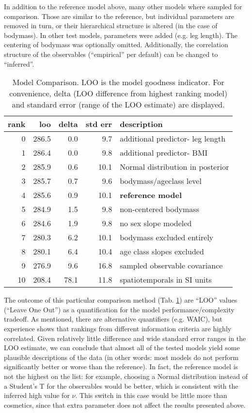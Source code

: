 In addition to the reference model above, many other models where sampled for comparison.
Those are similar to the reference, but individual parameters are removed in turn, or their hierarchical structure is altered (in the case of bodymass).
In other test models, parameters were added (e.g. leg length).
The centering of bodymass was optionally omitted.
Additionally, the correlation structure of the observables (``empirical'' per default) can be changed to ``inferred''.

\begin{table}[p]
\caption{\label{tab:stridemodelcomparison}Model Comparison. LOO is the model goodness indicator. For convenience, delta (LOO difference from highest ranking model) and standard error (range of the LOO estimate) are displayed.}
\centering
\begin{tabular}{rrrrl}
\textbf{rank} & \textbf{loo} & \textbf{delta} & \textbf{std err} & \textbf{description}\\[0pt]
\hline
0 & 286.5 & 0.0 & 9.7 & additional predictor- leg length\\[0pt]
1 & 286.4 & 0.0 & 9.8 & additional predictor- BMI\\[0pt]
2 & 285.9 & 0.6 & 10.1 & Normal distribution in posterior\\[0pt]
3 & 285.7 & 0.7 & 9.6 & bodymass/ageclass level\\[0pt]
4 & 285.6 & 0.9 & 10.1 & \textbf{reference model}\\[0pt]
5 & 284.9 & 1.5 & 9.8 & non-centered bodymass\\[0pt]
6 & 284.6 & 1.9 & 9.8 & no sex slope modeled\\[0pt]
7 & 280.3 & 6.2 & 10.1 & bodymass excluded entirely\\[0pt]
8 & 280.1 & 6.4 & 10.4 & age class slopes excluded\\[0pt]
9 & 276.9 & 9.6 & 16.8 & sampled observable covariance\\[0pt]
10 & 208.4 & 78.1 & 11.8 & spatiotemporals in SI units\\[0pt]
\end{tabular}
\end{table}


The outcome of this particular comparison method (Tab. \ref{tab:stridemodelcomparison}) are ``LOO'' values (``Leave One Out'') as a quantification for the model performance/complexity tradeoff.
As mentioned, there are alternative quantifiers (e.g. WAIC), but experience shows that rankings from different information criteria are highly correlated.
Given relatively little difference and wide standard error ranges in the LOO estimate, we can conclude that almost all of the tested models yield some plausible descriptions of the data (in other words: most models do not perform significantly better or worse than the reference).
In fact, the reference model is not the highest on the list: for example, choosing a Normal distribution instead of a Student's T for the observables would be better, which is consistent with the inferred high value for \(\nu\).
This switch in this case would be little more than cosmetics, since that extra parameter does not affect the results presented above.


